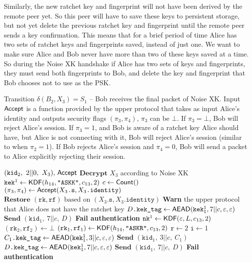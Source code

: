 \documentclass{article}
\begin{document}
Similarly, the new ratchet key and fingerprint will not have been derived by the remote peer yet. So this peer will have to save these keys to persistent storage, but not yet delete the previous ratchet key and fingerprint until the remote peer sends a key confirmation. This means that for a brief period of time Alice has two sets of ratchet keys and fingerprints saved, instead of just one. We want to make sure Alice and Bob never have more than two of these keys saved at a time. So during the Noise XK handshake if Alice has two sets of keys and fingerprints, they must send both fingerprints to Bob, and delete the key and fingerprint that Bob chooses not to use as the PSK.

\begin{algorithm}
	\caption{Transition $\delta(B_2, X_3)=S_1$ -- Bob receives the final packet of Noise XK. Input $\text{\sf Accept}$ is a function provided by the upper protocol that takes as input Alice's identity and outputs security flags $(\pi_3, \pi_4)$, $\pi_3$ can be $\bot$. If $\pi_3=\bot$, Bob will reject Alice's session. If $\pi_3=1$, and Bob is aware of a ratchet key Alice should have, but Alice is not connecting with it, Bob will reject Alice's session (similar to when $\pi_2=1$). If Bob rejects Alice's session and $\pi_4 = 0$, Bob will send a packet to Alice explicitly rejecting their session.}\label{alg:recv_x3}
	\begin{algorithmic}
		\Require $(\texttt{kid}_2,\ 2||0,\ X_3),\,\algn{Accept}$
		\State $\textbf{Decrypt } X_3$ according to Noise XK
		\State $\texttt{kek}^1 \gets \text{\sf KDF}(h_{14}, \texttt{"ASKK"}, c_{13}, 2)$
		\State $c \gets \text{\sf Count}()$
		\State $(\pi_3, \pi_4) \gets \text{\sf Accept}(X_3\texttt{.s}, X_3\texttt{.identity})$
		\If{$\pi_3 \neq \bot$}
			\State $\textbf{Restore } (\texttt{rk}, \texttt{rf}) \text{ based on } (X_3\texttt{.s}, X_3\texttt{.identity})$
					\State \textbf{Warn} the upper protocol that Alice does not have the ratchet key
				\Else
						\State $D\texttt{.kek\_tag} \gets \text{\sf AEAD}(\texttt{kek}^1_1, 7||c, \varepsilon, \varepsilon)$
						\State $\textbf{Send } (\texttt{kid}_1,\ 7||c,\ D)$
					\EndIf
					\State \textbf{Fail authentication}
				\EndIf
			\EndIf
			\State $\texttt{nk}^1 \gets \text{\sf KDF}(\varepsilon, L, c_{13}, 2)$
			\State $(\texttt{rk}_2, \texttt{rf}_2) \gets \bot$
			\State $(\texttt{rk}_1, \texttt{rf}_1) \gets \text{\sf KDF}(h_{14}, \texttt{"ASKR"}, c_{13}, 2)$
			\State $\texttt{r} \gets 2$
			\State $\texttt{i} \gets 1$
			\State $C_1\texttt{.kek\_tag} \gets \text{\sf AEAD}(\texttt{kek}^1_1, 3||c, \varepsilon, \varepsilon)$
			\State $\textbf{Send } (\texttt{kid}_1,\ 3||c,\ C_1)$
		\Else
				\State $D\texttt{.kek\_tag} \gets \text{\sf AEAD}(\texttt{kek}^1_1, 7||c, \varepsilon, \varepsilon)$
				\State $\textbf{Send } (\texttt{kid}_1,\ 7||c,\ D)$
			\EndIf
			\State \textbf{Fail authentication}
		\EndIf
	\end{algorithmic}
\end{algorithm}
\end{document}
